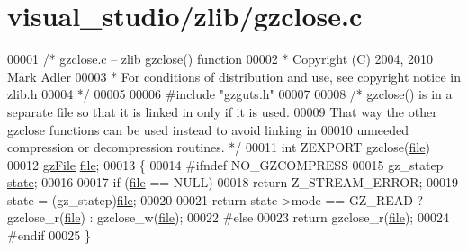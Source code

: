 \hypertarget{visual__studio_2zlib_2gzclose_8c_source}{}\section{visual\+\_\+studio/zlib/gzclose.c}
\label{visual__studio_2zlib_2gzclose_8c_source}

\begin{DoxyCode}
00001 \textcolor{comment}{/* gzclose.c -- zlib gzclose() function}
00002 \textcolor{comment}{ * Copyright (C) 2004, 2010 Mark Adler}
00003 \textcolor{comment}{ * For conditions of distribution and use, see copyright notice in zlib.h}
00004 \textcolor{comment}{ */}
00005 
00006 \textcolor{preprocessor}{#include "gzguts.h"}
00007 
00008 \textcolor{comment}{/* gzclose() is in a separate file so that it is linked in only if it is used.}
00009 \textcolor{comment}{   That way the other gzclose functions can be used instead to avoid linking in}
00010 \textcolor{comment}{   unneeded compression or decompression routines. */}
00011 \textcolor{keywordtype}{int} ZEXPORT gzclose(\hyperlink{structfile}{file})
00012     \hyperlink{structgz_file__s}{gzFile} \hyperlink{structfile}{file};
00013 \{
00014 \textcolor{preprocessor}{#ifndef NO\_GZCOMPRESS}
00015     gz\_statep \hyperlink{structstate}{state};
00016 
00017     \textcolor{keywordflow}{if} (\hyperlink{structfile}{file} == NULL)
00018         \textcolor{keywordflow}{return} Z\_STREAM\_ERROR;
00019     state = (gz\_statep)\hyperlink{structfile}{file};
00020 
00021     \textcolor{keywordflow}{return} state->mode == GZ\_READ ? gzclose\_r(\hyperlink{structfile}{file}) : gzclose\_w(\hyperlink{structfile}{file});
00022 \textcolor{preprocessor}{#else}
00023     \textcolor{keywordflow}{return} gzclose\_r(\hyperlink{structfile}{file});
00024 \textcolor{preprocessor}{#endif}
00025 \}
\end{DoxyCode}

